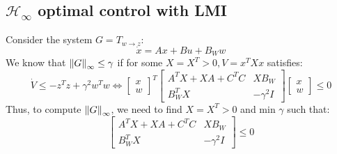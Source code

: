\documentclass{article}
\begin{document}
\subsection{\texorpdfstring{$\mathcal{H}_\infty$}. optimal control with LMI}
Consider the system $G = T_{w \rightarrow z}$: \[
\dot x = Ax + Bu + B_W w
\]
We know that $\norm{G}_\infty \leq \gamma$ if for some $X=X^T > 0, V=x^TXx$ satisfies:
\[
\dot V \leq -z^Tz + \gamma^2 w^Tw \iff \begin{bmatrix}
    x \\ w
\end{bmatrix}^T
\begin{bmatrix}
    A^TX + XA + C^TC & XB_W \\
    B_W^TX & -\gamma^2 I
\end{bmatrix}
\begin{bmatrix}
    x \\ w
\end{bmatrix}
\leq 0
\]
Thus, to compute $\norm{G}_\infty$, we need to find $X = X^T > 0$ and min $\gamma$ such that:
\[
\begin{bmatrix}
    A^TX + XA + C^TC & XB_W \\
    B_W^TX & -\gamma^2 I
\end{bmatrix} \leq 0
\]
\end{document}
